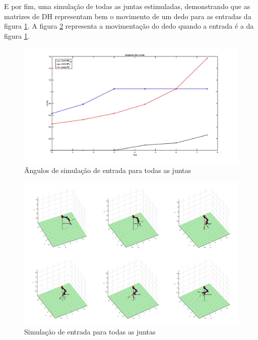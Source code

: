 E por fim, uma simulação de todas as juntas estimuladas, demonstrando que as matrizes de DH representam bem o movimento de um dedo para as entradas da figura \ref{ang_sim_DH}. A figura \ref{sim_DH} representa a movimentação do dedo quando a entrada é a da figura \ref{ang_sim_DH}.

\begin{figure}[H]
\centering
\includegraphics[width = 1\textwidth]{img/angulacao_tudo.jpg}
\caption[Ângulos de simulação de entrada para todas as juntas]{Ângulos de simulação de entrada para todas as juntas}
\label{ang_sim_DH}
\end{figure}

\begin{figure}[H]
\centering
\includegraphics[width = 1\textwidth]{img/sim_total.png}
\caption[Simulação de entrada para todas as juntas]{Simulação de entrada para todas as juntas}
\label{sim_DH}
\end{figure}

